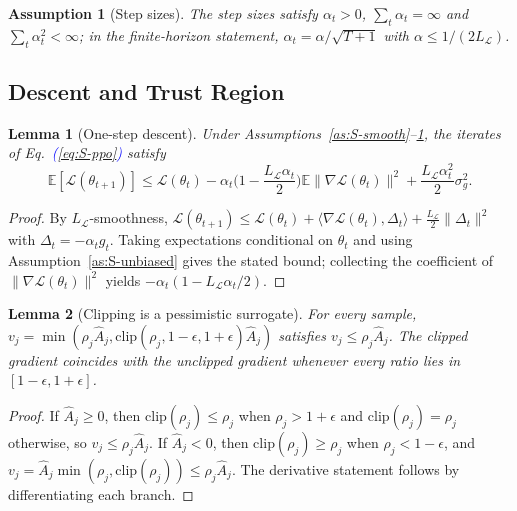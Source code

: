 \documentclass[conference]{IEEEtran}
\newtheorem{assumption}{Assumption}
\newtheorem{lemma}{Lemma}
\theoremstyle{remark}
\newcommand{\Eqref}[1]{\textcolor{blue}{(\ref{#1})}}
\newcommand{\cL}{\mathcal{L}}
\begin{document}
\begin{assumption}[Step sizes]
\label{as:S-steps}
The step sizes satisfy $\alpha_t>0$, $\sum_t\alpha_t=\infty$ and $\sum_t\alpha_t^2<\infty$; in the finite-horizon statement, $\alpha_t=\alpha/\sqrt{T+1}$ with $\alpha\le1/(2L_{\cL})$.
\end{assumption}

\subsection{Descent and Trust Region}
\label{sec:S-lemmas}

\begin{lemma}[One-step descent]
\label{lem:S-descent}
Under Assumptions~\ref{as:S-smooth}--\ref{as:S-steps}, the iterates of Eq.~\Eqref{eq:S-ppo} satisfy
\begin{equation}
\mathbb{E}[\cL(\theta_{t+1})]\le\cL(\theta_t)-\alpha_t\Big(1-\frac{L_{\cL}\alpha_t}{2}\Big)\mathbb{E}\|\nabla\cL(\theta_t)\|^2+\frac{L_{\cL}\alpha_t^2}{2}\sigma_g^2.
\label{eq:S-descent}
\end{equation}
\end{lemma}

\begin{proof}
By $L_{\cL}$-smoothness, $\cL(\theta_{t+1})\le\cL(\theta_t)+\langle\nabla\cL(\theta_t),\Delta_t\rangle+\frac{L_{\cL}}{2}\|\Delta_t\|^2$ with $\Delta_t=-\alpha_tg_t$. Taking expectations conditional on $\theta_t$ and using Assumption~\ref{as:S-unbiased} gives the stated bound; collecting the coefficient of $\|\nabla\cL(\theta_t)\|^2$ yields $-\alpha_t(1-L_{\cL}\alpha_t/2)$.
\end{proof}

\begin{lemma}[Clipping is a pessimistic surrogate]
\label{lem:S-clip}
For every sample, $v_j=\min(\rho_j\hat{A}_j,\mathrm{clip}(\rho_j,1-\epsilon,1+\epsilon)\hat{A}_j)$ satisfies $v_j\le\rho_j\hat{A}_j$. The clipped gradient coincides with the unclipped gradient whenever every ratio lies in $[1-\epsilon,1+\epsilon]$.
\end{lemma}

\begin{proof}
If $\hat{A}_j\ge0$, then $\mathrm{clip}(\rho_j)\le\rho_j$ when $\rho_j>1+\epsilon$ and $\mathrm{clip}(\rho_j)=\rho_j$ otherwise, so $v_j\le\rho_j\hat{A}_j$. If $\hat{A}_j<0$, then $\mathrm{clip}(\rho_j)\ge\rho_j$ when $\rho_j<1-\epsilon$, and $v_j=\hat{A}_j\min(\rho_j,\mathrm{clip}(\rho_j))\le\rho_j\hat{A}_j$. The derivative statement follows by differentiating each branch.
\end{proof}
\end{document}
